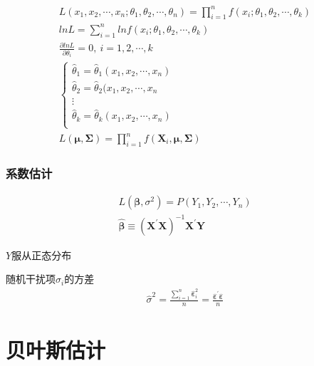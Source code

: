 \documentclass[12pt]{book}
\begin{document}
\begin{gather*}
    L\left(x_1,x_2,\cdots,x_n;\theta_1,\theta_2,\cdots,\theta_n\right) =\prod_{i=1}^{n}f\left(x_i;\theta_1,\theta_2,\cdots,\theta_k\right)\\
    lnL=\sum_{i=1}^{n}lnf\left(x_i;\theta_1,\theta_2,\cdots,\theta_k\right)\\
    \frac{\partial lnL}{\partial\theta_i}=0,\ i=1,2,\cdots,k\\
    \begin{cases}
        \hat{\theta}_1 = \hat{\theta}_1(x_1,x_2,\cdots,x_n) \\
        \hat{\theta}_2 = \hat{\theta}_2(x_1,x_2,\cdots,x_n  \\
        \vdots                                              \\
        \hat{\theta}_k = \hat{\theta}_k(x_1,x_2,\cdots,x_n) \\
    \end{cases}	\\
    L\left(\bm{\mu},\bm{\Sigma}\right) =\prod_{i=1}^{n}{f(\bm{X}_i,\bm{\mu},\bm{\Sigma})}
\end{gather*}


\subsubsection{系数估计}

\begin{gather*}
    L\left(\bm{\beta},\sigma^2\right) 	=P\left(Y_1,Y_2,\cdots,Y_n\right) \\
    \hat{\bm{\beta}} 	\equiv \left(\bm{X}^\prime\bm{X}\right)^{-1}\bm{X}^\prime\bm{Y}
\end{gather*}


$Y$服从正态分布

随机干扰项$\sigma_i$的方差
\begin{gather*}
    {\hat{\sigma}}^2
    =\frac{
    \sum_{i=1}^{n}{
    {\hat{\bm{\varepsilon}}}_i^2}
    }{n}
    =\frac{
        {\hat{\bm{\varepsilon}}}^\prime \hat{\bm{\varepsilon}}
    }{n}
\end{gather*}



















\section{贝叶斯估计}
\end{document}
